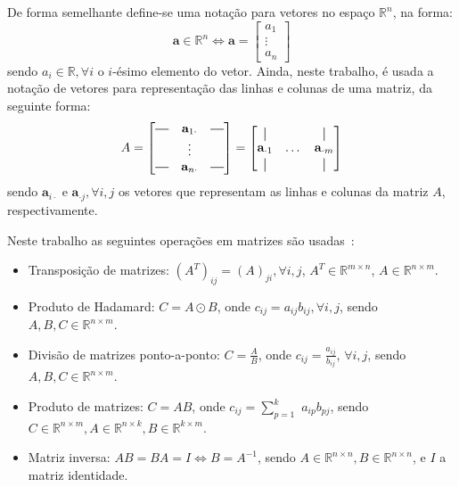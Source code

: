\documentclass[
    12pt,                %
    oneside,            %
    a4paper,            %
    english,            %
    brazil                %
    ]{abntex2ppgsi}
\newcommand*{\horzbar}{\rule[.5ex]{2.5ex}{0.5pt}}
\newcommand*{\vertbar}{\rule[-1ex]{0.5pt}{2.5ex}}
\begin{document}
De forma semelhante define-se uma notação para vetores no espaço $\mathbb{R}^n$, na forma:
\[
    \mathbf{a} \in \mathbb{R}^n \Leftrightarrow \mathbf{a} = \begin{bmatrix}
                                                                     a_{1}  \\
                                                                     \vdots \\
                                                                     a_{n}
                                                                 \end{bmatrix}
\]
sendo $a_i \in \mathbb{R}, \forall i$ o $i$-ésimo elemento do vetor.
Ainda, neste trabalho, é usada a notação de vetores para representação das linhas e colunas de uma matriz, da seguinte forma:
\[
    A = \begin{bmatrix}
            \horzbar & \mathbf{a}_{1 \cdot} & \horzbar \\
                     & \vdots               &          \\
            \horzbar & \mathbf{a}_{n \cdot} & \horzbar
        \end{bmatrix}
      = \begin{bmatrix}
            \vertbar             &          & \vertbar             \\
            \mathbf{a}_{\cdot 1} & \dots    & \mathbf{a}_{\cdot m} \\
            \vertbar             &          & \vertbar
        \end{bmatrix}
\]
sendo $\mathbf{a}_{i \cdot}$ e $\mathbf{a}_{\cdot j}, \forall i,j$ os vetores que representam as linhas e colunas da matriz $A$, respectivamente.

Neste trabalho as seguintes operações em matrizes são usadas~\cite{Golub1996}:
\begin{itemize}
    \item Transposição de matrizes: $(A^T)_{ij} = (A)_{ji}, \forall i, j$, $A^T \in \mathbb{R}^{m \times n}$, $A \in \mathbb{R}^{n \times m}$.
    \item Produto de Hadamard: $C=A\odot B$, onde $c_{ij} = a_{ij} b_{ij}, \forall i, j$, sendo $A, B, C \in \mathbb{R}^{n \times m}$.
    \item Divisão de matrizes ponto-a-ponto: $C = \frac{A}{B}$, onde $c_{ij} = \frac{a_{ij}}{b_{ij}}$, $\forall i, j$, sendo $A, B, C \in \mathbb{R}^{n \times m}$.
    \item Produto de matrizes: $C = AB$, onde $c_{ij} = \sum_{p = 1}^k$ $a_{ip} b_{pj}$, sendo $C \in \mathbb{R}^{n \times m}, A \in \mathbb{R}^{n \times k}, B \in \mathbb{R}^{k \times m}$.
    \item Matriz inversa: $AB = BA = I \Leftrightarrow B = A^{-1}$, sendo $A \in \mathbb{R}^{n \times n}, B \in \mathbb{R}^{n \times n}$, e $I$ a matriz identidade.
\end{itemize}
\end{document}
